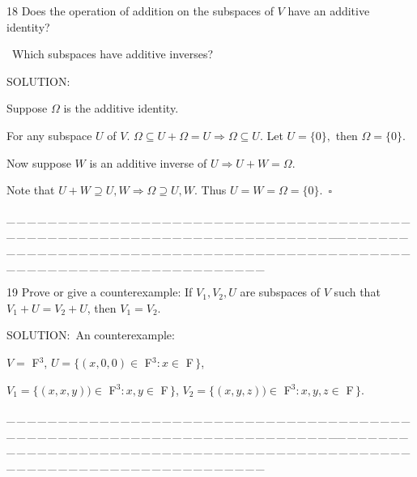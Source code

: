 \documentclass[a4paper, 11pt, UTF8]{article}
\begin{document}
\begin{large}
{\timesbf\Large 18} {\timessl\Large 
Does the operation of addition on the subspaces of $V$ have an additive identity?}\par\quad\,
{\timessl\Large Which subspaces have additive inverses?}\par
{\timesbf S\footnotesize{OLUTION:}}\par\quad
Suppose $\Omega$ is the additive identity.\par\quad
For any subspace $U$ of $V$. $\Omega\subseteq U+\Omega=U\Rightarrow\Omega\subseteq U$. Let $U=\{0\},$ then $\Omega=\{0\}.$\par\quad
Now suppose $W$ is an additive inverse of $U\Rightarrow U+W=\Omega$.\par\quad
Note that $U+W\supseteq U,W\Rightarrow \Omega\supseteq U,W$. Thus $U=W=\Omega=\{0\}.\,\,\,\square$\par
{\tiny \_\,\_\,\_\,\_\,\_\,\_\,\_\,\_\,\_\,\_\,\_\,\_\,\_\,\_\,\_\,\_\,\_\,\_\,\_\,\_\,\_\,\_\,\_\,\_\,\_\,\_\,\_\,\_\,\_\,\_\,\_\,\_\,\_\,\_\,\_\,\_\,\_\,\_\,\_\,\_\,\_\,\_\,\_\,\_\,\_\,\_\,\_\,\_\,\_\,\_\,\_\,\_\,\_\,\_\,\_\,\_\,\_\,\_\,\_\,\_\,\_\,\_\,\_\,\_\,\_\,\_\,\_\,\_\,\_\,\_\,\_\_\,\_\,\_\,\_\,\_\,\_\,\_\,\_\,\_\,\_\,\_\,\_\,\_\,\_\,\_\,\_\,\_\,\_\,\_\,\_\,\_\,\_\,\_\,\_\,\_\,\_\,\_\,\_\,\_\,\_\,\_\,\_\,\_\,\_\,\_\,\_\,\_\,\_\,\_\,\_\,\_\,\_\,\_\,\_\,\_\,\_\,\_\,\_\,\_\,\_\,\_\,\_\,\_\,\_\,\_\,\_\,\_\,\_\,\_\,\_\,\_\,\_\,\_\,\_\,\_\,\_\,\_\,\_\,\_\,\_\,\_}\par

{\timesbf\Large 19} {\timessl\Large 
Prove or give a counterexample: If $V_1,V_2,U$ are subspaces of $V$ such that $V_1+U=V_2+U$, then $V_1=V_2$.
}\par
{\timesbf S\footnotesize{OLUTION:}}\,\,\,An counterexample:\par\quad
$V=$ {\timesbf F}$^3$, $U=\{(x,0,0)\in$ {\timesbf F}$^3:x\in$ {\timesbf F}$\,\}$,\par\quad
$V_1=\{(x,x,y))\in$ {\timesbf F}$^3:x,y\in$ {\timesbf F}$\,\}$, $V_2=\{(x,y,z))\in$ {\timesbf F}$^3:x,y,z\in$ {\timesbf F}$\,\}$.
\par
{\tiny \_\,\_\,\_\,\_\,\_\,\_\,\_\,\_\,\_\,\_\,\_\,\_\,\_\,\_\,\_\,\_\,\_\,\_\,\_\,\_\,\_\,\_\,\_\,\_\,\_\,\_\,\_\,\_\,\_\,\_\,\_\,\_\,\_\,\_\,\_\,\_\,\_\,\_\,\_\,\_\,\_\,\_\,\_\,\_\,\_\,\_\,\_\,\_\,\_\,\_\,\_\,\_\,\_\,\_\,\_\,\_\,\_\,\_\,\_\,\_\,\_\,\_\,\_\,\_\,\_\,\_\,\_\,\_\,\_\,\_\,\_\_\,\_\,\_\,\_\,\_\,\_\,\_\,\_\,\_\,\_\,\_\,\_\,\_\,\_\,\_\,\_\,\_\,\_\,\_\,\_\,\_\,\_\,\_\,\_\,\_\,\_\,\_\,\_\,\_\,\_\,\_\,\_\,\_\,\_\,\_\,\_\,\_\,\_\,\_\,\_\,\_\,\_\,\_\,\_\,\_\,\_\,\_\,\_\,\_\,\_\,\_\,\_\,\_\,\_\,\_\,\_\,\_\,\_\,\_\,\_\,\_\,\_\,\_\,\_\,\_\,\_\,\_\,\_\,\_\,\_\,\_}{\tiny\,\par}{\,\par}\,\par


\end{large}
\end{document}
